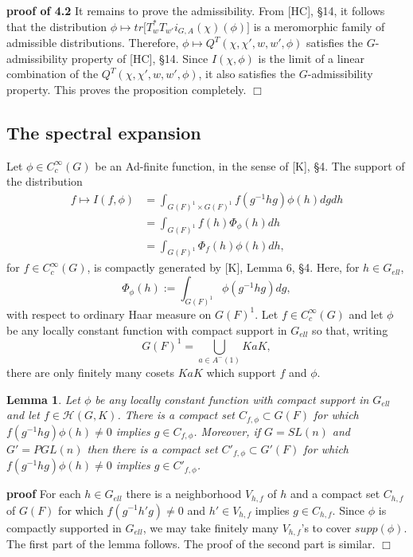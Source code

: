 \documentclass[12pt]{article}
\newtheorem{lemma}{Lemma}[section]
\newenvironment{pf}[1][proof:]{\par\medskip\noindent\textbf{#1} }{\par\medskip}
\begin{document}
\begin{pf}[proof of 4.2]
It remains to prove the admissibility. From [HC], \S14, it follows that the distribution $\phi\longmapsto tr\big[T^*_wT_{w'}i_{G,A}(\chi)(\phi)\big]$ is a meromorphic family of admissible distributions. Therefore, $\phi\longmapsto Q^T(\chi,\chi',w,w',\phi)$ satisfies the $G$-admissibility property of [HC], \S14. Since $I(\chi,\phi)$ is the limit of a linear combination of the $Q^T(\chi,\chi',w,w',\phi)$, it also satisfies the $G$-admissibility property. This proves the proposition completely. $\Box$
\end{pf}

\subsection{The spectral expansion}

Let $\phi\in C_c^\infty(G)$ be an Ad-finite function, in the sense of [K], \S4. The support of the distribution
\begin{equation}\tag{4.8}
\begin{array}{rl}
f\longmapsto I(f,\phi)&=\int_{G(F)^1\times G(F)^1}f(g^{-1}hg)\phi(h)dgdh\\
&=\int_{G(F)^1}f(h)\Phi_\phi(h)dh\\
&=\int_{G(F)^1}\Phi_f(h)\phi(h)dh,
\end{array}
\end{equation}
for $f\in C_c^\infty(G)$, is compactly generated by [K], Lemma 6, \S4. Here, for $h\in G_{ell}$,
\[
\Phi_\phi(h):=\int_{G(F)^1}\phi(g^{-1}hg)dg,
\]
with respect to ordinary Haar measure on $G(F)^1$. Let $f\in C_c^\infty(G)$ and let $\phi$ be any locally constant function with compact support in $G_{ell}$ so that, writing
\[
G(F)^1=\bigcup_{a\in A^-(1)}KaK,
\]
there are only finitely many cosets $KaK$ which support $f$ and $\phi$.

\begin{lemma}
Let $\phi$ be any locally constant function with compact support in $G_{ell}$ and let $f\in\mathcal{H}(G,K)$. There is a compact set $C_{f,\phi}\subset G(F)$ for which $f(g^{-1}hg)\phi(h)\neq0$ implies $g\in C_{f,\phi}$. Moreover, if $G=SL(n)$ and $G'=PGL(n)$ then there is a compact set $C'_{f,\phi}\subset G'(F)$ for which $f(g^{-1}hg)\phi(h)\neq0$ implies $g\in C'_{f,\phi}$.
\end{lemma}

\begin{pf}[proof]
For each $h\in G_{ell}$ there is a neighborhood $V_{h,f}$ of $h$ and a compact set $C_{h,f}$ of $G(F)$ for which $f(g^{-1}h'g)\neq0$ and $h'\in V_{h,f}$ implies $g\in C_{h,f}$. Since $\phi$ is compactly supported in $G_{ell}$, we may take finitely many $V_{h,f}$'s to cover $supp(\phi)$. The first part of the lemma follows. The proof of the second part is similar. $\Box$
\end{pf}
\end{document}
